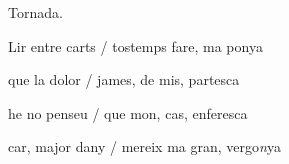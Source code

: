 \documentclass[12pt]{article}
\begin{document}
\begin{estrofaExtra}%




\begin{tornada}

Tornada.

\end{tornada}


\end{estrofaExtra}


\begin{estrofa}

 Lir entre carts / tostemps fare, ma ponya \cite{ref30}

 que la dolor / james, de mis, partesca

 he no penseu / que mon, cas, enferesca

 car, major dany / mereix ma gran, vergo\textit{n}ya

\end{estrofa}
\end{document}
